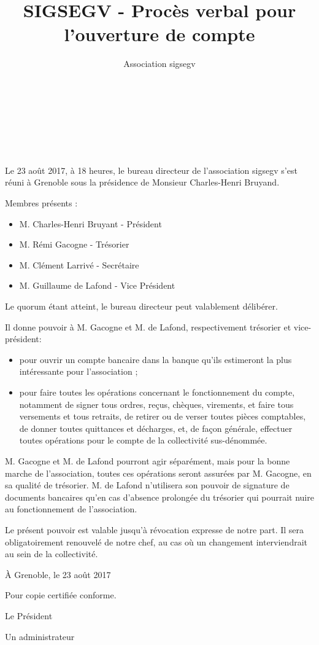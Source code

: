 \documentclass[a4paper,oneside,10pt]{article}
\begin{document}
\author{Association sigsegv}
\date{}
\title{SIGSEGV - Procès verbal pour l'ouverture de compte}

{ \\
}
\vspace{5mm}
{\centering {\textbf {\Huge -}}\\
}
\vspace{5mm}
{\\
}

\section*{}

Le 23 août 2017, à 18 heures, le bureau directeur de l'association sigsegv s'est réuni à Grenoble sous la présidence de Monsieur Charles-Henri Bruyand.

Membres présents :

\begin{itemize}
  \item M. Charles-Henri Bruyant - Président
  \item M. Rémi Gacogne - Trésorier
  \item M. Clément Larrivé - Secrétaire
  \item M. Guillaume de Lafond - Vice Président
\end{itemize}

Le quorum étant atteint, le bureau directeur peut valablement délibérer.

Il donne pouvoir à M. Gacogne et M. de Lafond, respectivement trésorier et vice-président:\\
\begin{itemize}
  \item pour ouvrir un compte bancaire dans la banque qu'ils estimeront la plus intéressante pour l'association ;
  \item pour faire toutes les opérations concernant le fonctionnement du compte, notamment de signer tous ordres,
    reçus, chèques, virements, et faire tous versements et tous retraits,
    de retirer ou de verser toutes pièces comptables, de donner toutes quittances et décharges, et, de façon
    générale, effectuer toutes opérations pour le compte de la collectivité sus-dénommée.\\
\end{itemize}

M. Gacogne et M. de Lafond pourront agir séparément, mais pour la bonne marche de l'association, toutes ces opérations
seront assurées par M. Gacogne, en sa qualité de trésorier. M. de Lafond n'utilisera son pouvoir de signature de
documents bancaires qu'en cas d'absence prolongée du trésorier qui pourrait nuire au fonctionnement de
l'association.


Le présent pouvoir est valable jusqu'à révocation expresse de notre part. Il sera obligatoirement renouvelé
de notre chef, au cas où un changement interviendrait au sein de la collectivité.

À Grenoble, le 23 août 2017

Pour copie certifiée conforme.

Le Président

Un administrateur
\end{document}
